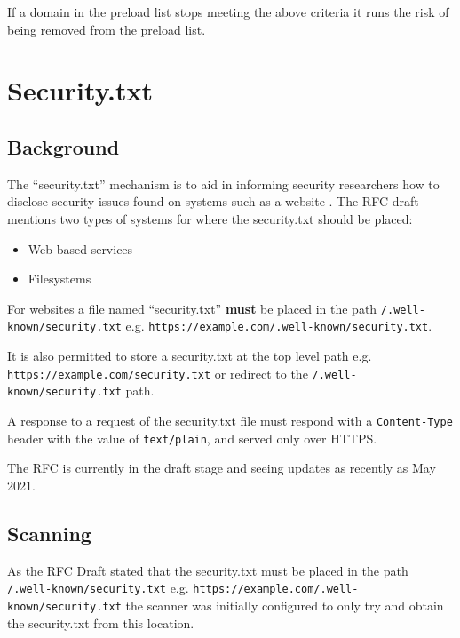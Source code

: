 \documentclass{mscreport}
\begin{document}
\vspace{0.3cm} \noindent
If a domain in the preload list stops meeting the above criteria it runs the risk of being removed from the preload list.

\clearpage
\newpage

\clearpage
\section{Security.txt}
\label{section:security_txt}

\subsection{Background}
The ``security.txt'' mechanism is to aid in informing security researchers how to disclose security issues found on systems such as a website \cite{Foudil2021-vh}. The RFC draft mentions two types of systems for where the security.txt should be placed:

\begin{itemize}
  \item Web-based services
  \item Filesystems
\end{itemize}

\vspace{0.3cm} \noindent
For websites a file named ``security.txt'' \textbf{must} be placed in the path \texttt{/.well-known/security.txt} e.g. \texttt{https://example.com/.well-known/security.txt}.

\vspace{0.3cm} \noindent
It is also permitted to store a security.txt at the top level path e.g. \texttt{https://example.com/security.txt} or redirect to the \texttt{/.well-known/security.txt} path.

\vspace{0.3cm} \noindent
A response to a request of the security.txt file must respond with a \texttt{Content-Type} header with the value of \texttt{text/plain}, and served only over HTTPS.

\vspace{0.3cm} \noindent
The RFC is currently in the draft stage and seeing updates as recently as May 2021.

\subsection{Scanning}

\vspace{0.3cm} \noindent
As the RFC Draft stated that the security.txt must be placed in the path \newline \texttt{/.well-known/security.txt} e.g. \texttt{https://example.com/.well-known/security.txt} the scanner was initially configured to only try and obtain the security.txt from this location.
\end{document}
